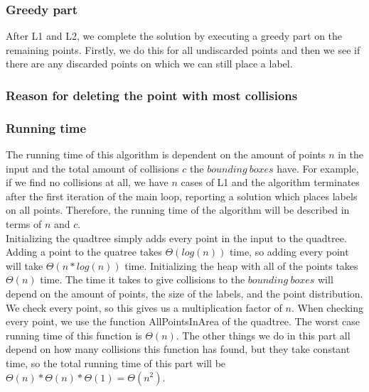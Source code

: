 \documentclass[crop=false,a4paper,oneside,11pt]{article}
\begin{document}
\subsubsection{Greedy part}
After L1 and L2, we complete the solution by executing a greedy part on the remaining points. Firstly, we do this for all undiscarded points and then we see if there are any discarded points on which we can still place a label.

\subsubsection{Reason for deleting the point with most collisions}

\subsubsection{Running time}
The running time of this algorithm is dependent on the amount of points $n$ in the input and the total amount of collisions $c$ the $bounding \ boxes$ have. For example, if we find no collisions at all, we have $n$ cases of L1 and the algorithm terminates after the first iteration of the main loop, reporting a solution which places labels on all points. Therefore, the running time of the algorithm will be described in terms of $n$ and $c$. \\
Initializing the quadtree simply adds every point in the input to the quadtree. Adding a point to the quatree takes $\Theta(log(n))$ time, so adding every point will take $\Theta(n*log(n))$ time. Initializing the heap with all of the points takes $\Theta(n)$ time. The time it takes to give collisions to the $bounding \ boxes$ will depend on the amount of points, the size of the labels, and the point distribution. We check  every point, so this gives us a multiplication factor of $n$. When checking every point, we use the function AllPointsInArea of the quadtree. The worst case running time of this function is $\Theta(n)$. The other things we do in this part all depend on how many collisions this function has found, but they take constant time, so the total running time of this part will be $\Theta(n)*\Theta(n)*\Theta(1) = \Theta(n^2)$.
  \\ \\
\end{document}
